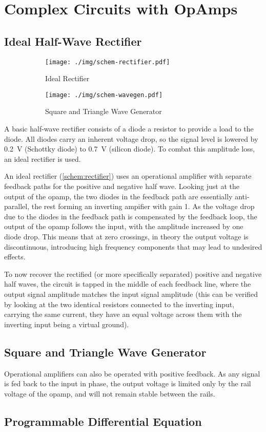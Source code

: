 \chapter{Complex Circuits with OpAmps}
\section{Ideal Half-Wave Rectifier}

\begin{figure}
	\centering
	\begin{subfigure}{0.4\textwidth}
		\centering
		\texttt{[image: ./img/schem-rectifier.pdf]}
		\caption{Ideal Rectifier}
		\label{schem:rectifier}
	\end{subfigure}
	\begin{subfigure}{0.4\textwidth}
		\centering
		\texttt{[image: ./img/schem-wavegen.pdf]}
		\caption{Square and Triangle Wave Generator}
		\label{schem:wavegen}
	\end{subfigure}
	\caption{}
\end{figure}

A basic half-wave rectifier consists of a diode a resistor to provide a load to the diode.
All diodes carry an inherent voltage drop, so the signal level is lowered by \SI{0.2}{\volt} (Schottky diode) to \SI{0.7}{\volt} (silicon diode).
To combat this amplitude loss, an ideal rectifier is used.

An ideal rectifier (\autoref{schem:rectifier}) uses an operational amplifier with separate feedback paths for the positive and negative half wave.
Looking just at the output of the opamp, the two diodes in the feedback path are essentially anti-parallel, the rest forming an inverting ampifier with gain 1.
As the voltage drop due to the diodes in the feedback path is compensated by the feedback loop, the output of the opamp follows the input, with the amplitude increased by one diode drop.
This means that at zero crossings, in theory the output voltage is discontinuous, introducing high frequency components that may lead to undesired effects.

To now recover the rectified (or more specifically separated) positive and negative half waves, the circuit is tapped in the middle of each feedback line, where the output signal amplitude matches the input signal amplitude (this can be verified by looking at the two identical resistors connected to the inverting input, carrying the same current, they have an equal voltage across them with the inverting input being a virtual ground).

\section{Square and Triangle Wave Generator}

Operational amplifiers can also be operated with positive feedback.
As any signal is fed back to the input in phase, the output voltage is limited only by the rail voltage of the opamp, and will not remain stable between the rails.

\section{Programmable Differential Equation}
